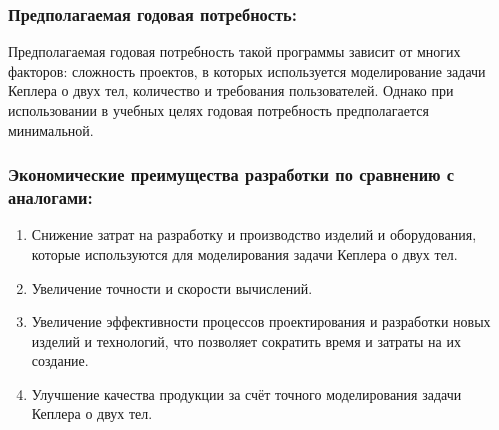  \subsubsection*{Предполагаемая годовая потребность:}
 Предполагаемая годовая потребность такой программы зависит от многих факторов: сложность проектов, в которых используется моделирование задачи Кеплера о двух тел, количество и требования пользователей. Однако при использовании в учебных целях годовая потребность предполагается минимальной.\newline

 \subsubsection*{Экономические преимущества разработки по сравнению с аналогами:}
 \begin{enumerate}
  \item Снижение затрат на разработку и производство изделий и оборудования, которые используются для моделирования задачи Кеплера о двух тел.
  \item Увеличение точности и скорости вычислений.
  \item Увеличение эффективности процессов проектирования и разработки новых изделий и технологий, что позволяет сократить время и затраты на их создание.
  \item Улучшение качества продукции за счёт точного моделирования задачи Кеплера о двух тел.\newline
 \end{enumerate}

